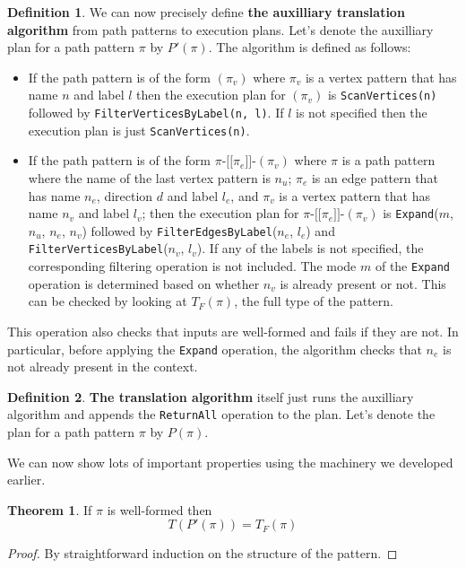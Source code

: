 \documentclass[14pt]{constructor-thesis}
\theoremstyle{definition}
\newtheorem*{theorem}{Theorem}
\newtheorem*{definition}{Definition}
\newcommand{\patternstart}[1]{(#1)}
\newcommand{\patternhop}[3]{#1 \texttt{-[[} #2 \texttt{]]-} (#3)}
\begin{document}
\begin{definition}
  We can now precisely define \textbf{the auxilliary translation algorithm} from path patterns to execution plans. Let's denote the auxilliary plan for a path pattern $\pi$ by $P'(\pi)$. The algorithm is defined as follows:
  \begin{itemize}
    \item If the path pattern is of the form $\patternstart{\pi_v}$ where $\pi_v$ is a vertex pattern that has name $n$ and label $l$ then the execution plan for $(\pi_v)$ is \texttt{ScanVertices(n)} followed by \texttt{FilterVerticesByLabel(n, l)}. If $l$ is not specified then the execution plan is just \texttt{ScanVertices(n)}.

    \item If the path pattern is of the form $\patternhop{\pi}{\pi_e}{\pi_v}$ where $\pi$ is a path pattern where the name of the last vertex pattern is $n_u$; $\pi_e$ is an edge pattern that has name $n_e$, direction $d$ and label $l_e$, and $\pi_v$ is a vertex pattern that has name $n_v$ and label $l_v$; then the execution plan for $\patternhop{\pi}{\pi_e}{\pi_v}$ is \texttt{Expand}($m$, $n_u$, $n_e$, $n_v$) followed by \texttt{FilterEdgesByLabel}($n_e$, $l_e$) and \texttt{FilterVerticesByLabel}($n_v$, $l_v$). 
    If any of the labels is not specified, the corresponding filtering operation is not included. The mode $m$ of the \texttt{Expand} operation is determined based on whether $n_v$ is already present or not. This can be checked by looking at $T_F(\pi)$, the full type of the pattern.
  \end{itemize} 

  This operation also checks that inputs are well-formed and fails if they are not. In particular, before applying the \texttt{Expand} operation, the algorithm checks that $n_e$ is not already present in the context.
\end{definition}

\begin{definition}
  \textbf{The translation algorithm} itself just runs the auxilliary algorithm and appends the \texttt{ReturnAll} operation to the plan.
  Let's denote the plan for a path pattern $\pi$ by $P(\pi)$.
\end{definition}

 We can now show lots of important properties using the machinery we developed earlier.

\begin{theorem} If $\pi$ is well-formed then
  $$T(P'(\pi)) = T_F(\pi)$$
\end{theorem}
\begin{proof}
  By straightforward induction on the structure of the pattern.
\end{proof}
\end{document}
